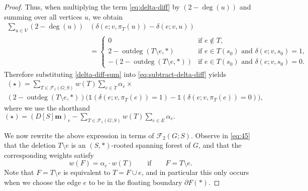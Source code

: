 \documentclass[12pt]{amsart}
\theoremstyle{definition}
\newcommand{\one}{\mathds{1}}
\newcommand{\boldm}{\mathbf{m}}
\newcommand{\trees}{\mathcal{F}_1}
\newcommand{\forests}{\mathcal{F}}
\DeclareMathOperator{\outdeg}{outdeg}
\begin{document}
\begin{proof}
Thus, when multiplying the term \eqref{eq:delta-diff} by $(2 - \deg(u))$ and summing over all vertices $u$, we obtain
\begin{align}
	\sum_{u \in V} (2 - \deg(u)) &\left(\delta(e; v, \pi_T(u)) - \delta(e; v, u)\right) \\
	&= \begin{cases}
	0 &\text{if } e \not \in T, \\
	2 - \outdeg(T \setminus e, *) &\text{if } e \in T(s_0) \text{ and } \delta(e; v, s_0) = 1, \\
	-(2 - \outdeg(T \setminus e, *)) &\text{if } e \in T(s_0) \text{ and } \delta(e; v, s_0) = 0 .
	\end{cases} \label{delta-diff-sum}
\end{align}
Therefore substituting \eqref{delta-diff-sum} into \eqref{eq:subtract-delta-diff} yields
\begin{multline}\label{eq:45}
	(\star)
	= \sum_{T\in \trees(G;S)} \! w({T}) \sum_{e \in T} \alpha_e \times \\
	( 2 - \outdeg(T\setminus e,*)) \Big( \one(\delta(e; v, \pi_T(e)) = 1) \! - \one(\delta(e; v, \pi_T(e)) = 0) \Big),
\end{multline}
where we use the shorthand
$\displaystyle
	(\star) = (D[S] \boldm)_v - \sum_{T \in \trees(G;S)} w({T}) \sum_{e \in E} \alpha_e.
$

We now rewrite the above expression in terms of $\forests_2(G;S)$.
Observe in \eqref{eq:45} that the deletion $T \setminus e$ is an $(S,*)$-rooted spanning forest of $G$, and that the corresponding weights satisfy
\[
	w({F}) = \alpha_e \cdot w({T}) \qquad\text{if}\qquad F = T \setminus e.
\]
Note that $F = T \setminus e$ is equivalent to $T = F \cup e$, and in particular this only occurs when we choose the edge $e$ to be in the floating boundary $\partial F(*)$.


\end{proof}
\end{document}
